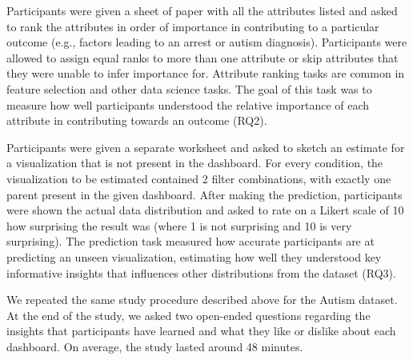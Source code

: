  Participants were given a sheet of paper with all the attributes listed and asked to rank the attributes in order of importance in contributing to a particular outcome (e.g., factors leading to an arrest or autism diagnosis). Participants were allowed to assign equal ranks to more than one attribute or skip attributes that they were unable to infer importance for. Attribute ranking tasks are common in feature selection and other data science tasks. The goal of this task was to measure how well participants understood the relative importance of each attribute in contributing towards an outcome (RQ2).

 Participants were given a separate worksheet and asked to sketch an estimate for a visualization that is not present in the dashboard. For every condition, the visualization to be estimated contained 2 filter combinations, with exactly one parent present in the given dashboard. After making the prediction, participants were shown the actual data distribution and asked to rate on a Likert scale of 10 how surprising the result was (where 1 is not surprising and 10 is very surprising). The prediction task measured how accurate participants are at predicting an unseen visualization, estimating how well they understood key informative insights that influences other distributions from the dataset (RQ3).
\par We repeated the same study procedure described above for the Autism dataset. At the end of the study, we asked two open-ended questions regarding the insights that participants have learned and what they like or dislike about each dashboard. On average, the study lasted around 48 minutes.
